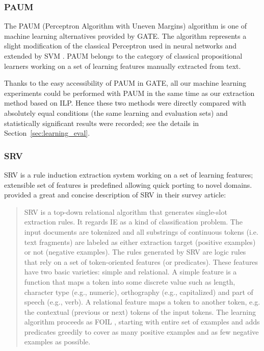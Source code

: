 \subsubsection{PAUM}

The PAUM (Perceptron Algorithm with Uneven Margins) algorithm \citep{Li:Paum} is one of machine learning alternatives provided by GATE. The algorithm represents a slight modification of the classical Perceptron \citep{rosenblatt1957perceptron} used in neural networks and extended by SVM \citep{springerlink:10.1007/BF00994018}. PAUM belongs to the category of classical propositional learners working on a set of learning features manually extracted from text.

Thanks to the easy accessibility of PAUM in GATE, all our machine learning experiments could be performed with PAUM in the same time as our extraction method based on ILP. Hence these two methods were directly compared with absolutely equal conditions (the same learning and evaluation sets) and statistically significant results were recorded; see the details in Section~\ref{sec:learning_eval}.

\subsubsection{SRV}

SRV \citep{Freitag:1999_phd} is a rule induction extraction system working on a set of learning features; extensible set of features is predefined allowing quick porting to novel domains. \cite{biblio:Survey_of_Web_Information_Extraction_Systems} provided a great and concise description of SRV in their survey article:
\begin{quotation}
SRV is a top-down relational algorithm that generates single-slot extraction rules. It regards IE as a kind of classification
problem. The input documents are tokenized and all substrings of continuous tokens (i.e. text fragments) are labeled as either extraction target (positive examples) or not (negative examples). The rules generated by SRV are logic rules that rely on a set of token-oriented features (or predicates). These features have two basic varieties: simple and relational. A simple feature is a function that maps a token into some discrete value such as length, character type (e.g., numeric), orthography (e.g., capitalized) and part of speech (e.g., verb). A relational feature maps a token to another
token, e.g. the contextual (previous or next) tokens of the input tokens. The learning algorithm proceeds as FOIL \citep{Quinlan:1990:LLD:97128.637817}, starting with entire set of examples and adds predicates greedily to cover as many positive examples and as few negative examples as possible.
\end{quotation}

